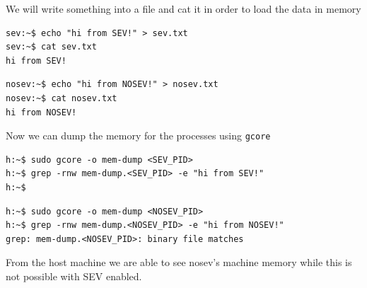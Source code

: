 \documentclass[twocolumn]{article}
\begin{document}
We will write something into a file and cat it in order to load the data in memory

\begin{verbatim}
sev:~$ echo "hi from SEV!" > sev.txt
sev:~$ cat sev.txt
hi from SEV!
\end{verbatim}

\begin{verbatim}
nosev:~$ echo "hi from NOSEV!" > nosev.txt
nosev:~$ cat nosev.txt
hi from NOSEV!
\end{verbatim}

Now we can dump the memory for the processes using \texttt{gcore}

\begin{verbatim}
h:~$ sudo gcore -o mem-dump <SEV_PID>
h:~$ grep -rnw mem-dump.<SEV_PID> -e "hi from SEV!"
h:~$
\end{verbatim}

\begin{verbatim}
h:~$ sudo gcore -o mem-dump <NOSEV_PID>
h:~$ grep -rnw mem-dump.<NOSEV_PID> -e "hi from NOSEV!"
grep: mem-dump.<NOSEV_PID>: binary file matches
\end{verbatim}

From the host machine we are able to see nosev's machine memory while this is not possible with SEV enabled.
\end{document}
